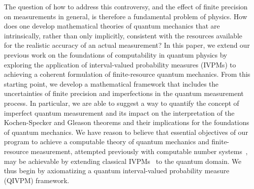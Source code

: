 \documentclass[english,reprint, aps, prl,superscriptaddress, showpacs,
showkeys, longbibliography, amsmath, amssymb, floatfix]{revtex4-1}
\theoremstyle{plain}
\theoremstyle{definition}
\begin{document}
The question of how to address this controversy, and the effect of 
finite precision on measurements in general, is therefore 
a fundamental problem of physics.  How does one
develop mathematical theories of quantum mechanics that are
intrinsically, rather than only implicitly, consistent with the
resources available for the realistic accuracy of an actual
measurement?   In this paper, we extend our previous work on the
foundations of computability in quantum physics by exploring the
application of interval-valued probability measures (IVPMs) to
achieving a coherent formulation of finite-resource quantum mechanics.
From this starting point, we develop a mathematical framework that includes the
uncertainties of finite precision and imperfections in the quantum
measurement process.  In particular, we are able to suggest a way to quantify
the concept of imperfect quantum measurement and its impact on the interpretation of
the Kochen-Specker and Gleason theorems and their implications for the
foundations of quantum mechanics.  We have reason to believe that
essential objectives of our program to achieve a computable theory of
quantum mechanics and finite-resource measurement, attempted
previously with computable number
systems~\cite{usat,geometry2013apsrev4,DQT2014}, may be achievable by
extending classical IVPMs~\cite{JamisonLodwick2004} to the quantum
domain.  We thus begin by axiomatizing a quantum interval-valued
probability measure (QIVPM) framework.
\end{document}

